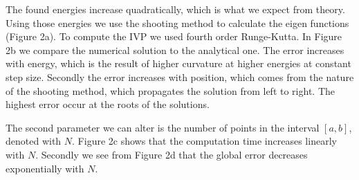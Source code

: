 \documentclass[12pt, a4paper]{article}
\begin{document}
The found energies increase quadratically, which is what we expect from theory. Using those energies we use the shooting method to calculate the eigen functions (Figure 2a). To compute the IVP we used fourth order Runge-Kutta. In Figure 2b we compare the numerical solution to the analytical one. The error increases with energy, which is the result of higher curvature at higher energies at constant step size. Secondly the error increases with position, which comes from the nature of the shooting method, which propagates the solution from left to right. The highest error occur at the roots of the solutions.

The second parameter we can alter is the number of points in the interval $[a, b]$, denoted with $N$. Figure 2c shows that the computation time increases linearly with $N$. Secondly we see from Figure 2d that the global error decreases exponentially with $N$.
\end{document}
